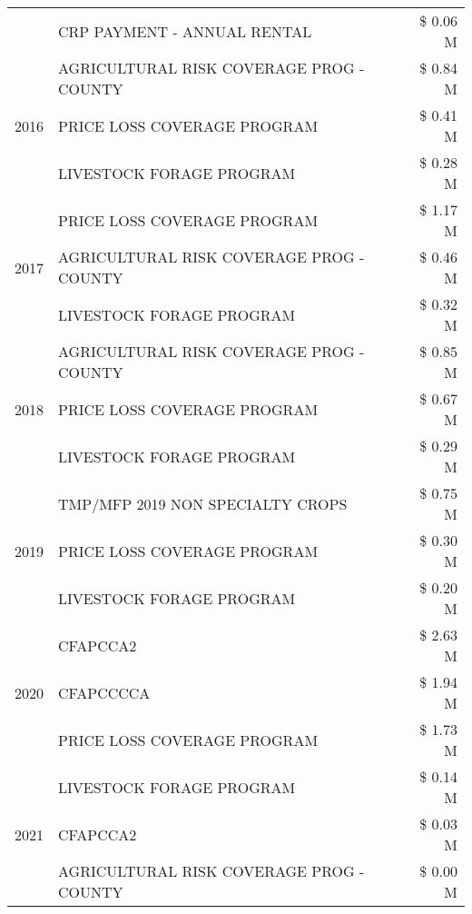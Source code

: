 \begin{tabular}{llr}
 & CRP PAYMENT - ANNUAL RENTAL & \$ 0.06 M \\
\cline{1-3}
\multirow[t]{3}{*}{2016} & AGRICULTURAL RISK COVERAGE PROG - COUNTY & \$ 0.84 M \\
 & PRICE LOSS COVERAGE PROGRAM & \$ 0.41 M \\
 & LIVESTOCK FORAGE PROGRAM & \$ 0.28 M \\
\cline{1-3}
\multirow[t]{3}{*}{2017} & PRICE LOSS COVERAGE PROGRAM & \$ 1.17 M \\
 & AGRICULTURAL RISK COVERAGE PROG - COUNTY & \$ 0.46 M \\
 & LIVESTOCK FORAGE PROGRAM & \$ 0.32 M \\
\cline{1-3}
\multirow[t]{3}{*}{2018} & AGRICULTURAL RISK COVERAGE PROG - COUNTY & \$ 0.85 M \\
 & PRICE LOSS COVERAGE PROGRAM & \$ 0.67 M \\
 & LIVESTOCK FORAGE PROGRAM & \$ 0.29 M \\
\cline{1-3}
\multirow[t]{3}{*}{2019} & TMP/MFP 2019 NON SPECIALTY CROPS & \$ 0.75 M \\
 & PRICE LOSS COVERAGE PROGRAM & \$ 0.30 M \\
 & LIVESTOCK FORAGE PROGRAM & \$ 0.20 M \\
\cline{1-3}
\multirow[t]{3}{*}{2020} & CFAPCCA2 & \$ 2.63 M \\
 & CFAPCCCCA & \$ 1.94 M \\
 & PRICE LOSS COVERAGE PROGRAM & \$ 1.73 M \\
\cline{1-3}
\multirow[t]{3}{*}{2021} & LIVESTOCK FORAGE PROGRAM & \$ 0.14 M \\
 & CFAPCCA2 & \$ 0.03 M \\
 & AGRICULTURAL RISK COVERAGE PROG - COUNTY & \$ 0.00 M \\
\cline{1-3}
\bottomrule
\end{tabular}

